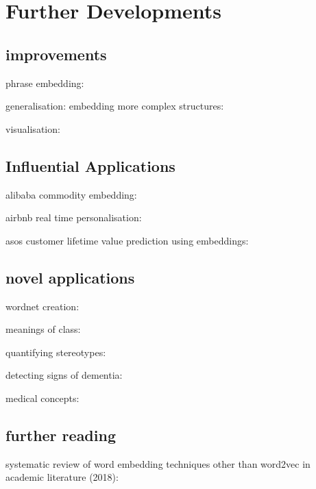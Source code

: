 \chapter{Further Developments}\label{chapter:further-developments}
\section{improvements}
phrase embedding:~\cite{mikolov13_distr_repres_words_phras_their_compos}

generalisation: embedding more complex structures:~\cite{grohe20_word2_node2}

visualisation: ~\cite{liu-2018-visual-explor}

\section{Influential Applications}
alibaba commodity embedding:~\cite{wang-2018-billion-scale-commodity-embedding}

airbnb real time personalisation:~\cite{grbovic-2018-real-time-personalization}

asos customer lifetime value prediction using embeddings:~\cite{chamberlain17_custom_lifet_value_predic_using_embed}


\section{novel applications}

wordnet creation:~\cite{khodak-etal-2017-automated}

meanings of class:~\cite{kozlowski19_geomet_cultur}

quantifying stereotypes:~\cite{garg-2018-word-embeddings-quantify}

detecting signs of dementia:~\cite{mirheidari_2018_detecting_signs_of_dementia}

medical concepts:~\cite{ChoiChiuSon_amia16}

\section{further reading}
systematic review of word embedding techniques other than word2vec in academic literature (2018):~\cite{gutiérrez_2018_a_systematic}
